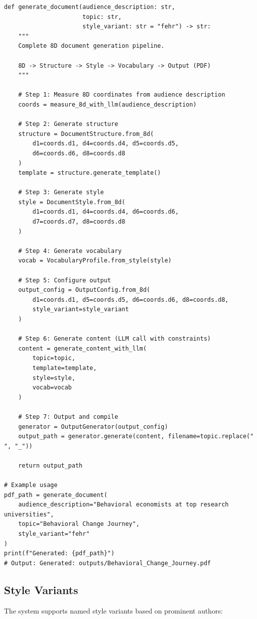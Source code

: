 \begin{verbatim}
def generate_document(audience_description: str,
                      topic: str,
                      style_variant: str = "fehr") -> str:
    """
    Complete 8D document generation pipeline.

    8D -> Structure -> Style -> Vocabulary -> Output (PDF)
    """

    # Step 1: Measure 8D coordinates from audience description
    coords = measure_8d_with_llm(audience_description)

    # Step 2: Generate structure
    structure = DocumentStructure.from_8d(
        d1=coords.d1, d4=coords.d4, d5=coords.d5,
        d6=coords.d6, d8=coords.d8
    )
    template = structure.generate_template()

    # Step 3: Generate style
    style = DocumentStyle.from_8d(
        d1=coords.d1, d4=coords.d4, d6=coords.d6,
        d7=coords.d7, d8=coords.d8
    )

    # Step 4: Generate vocabulary
    vocab = VocabularyProfile.from_style(style)

    # Step 5: Configure output
    output_config = OutputConfig.from_8d(
        d1=coords.d1, d5=coords.d5, d6=coords.d6, d8=coords.d8,
        style_variant=style_variant
    )

    # Step 6: Generate content (LLM call with constraints)
    content = generate_content_with_llm(
        topic=topic,
        template=template,
        style=style,
        vocab=vocab
    )

    # Step 7: Output and compile
    generator = OutputGenerator(output_config)
    output_path = generator.generate(content, filename=topic.replace(" ", "_"))

    return output_path

# Example usage
pdf_path = generate_document(
    audience_description="Behavioral economists at top research universities",
    topic="Behavioral Change Journey",
    style_variant="fehr"
)
print(f"Generated: {pdf_path}")
# Output: Generated: outputs/Behavioral_Change_Journey.pdf
\end{verbatim}

\subsection{Style Variants}

The system supports named style variants based on prominent authors:

